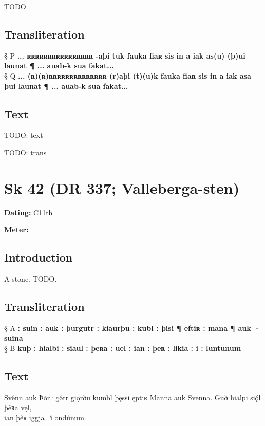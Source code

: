 TODO.

\subsection{Transliteration}

§ P \textbf{    ... ʀʀʀʀʀʀʀʀʀʀʀʀʀʀʀʀ -aþi tuk fauka fiaʀ sis in a iak as(u) (þ)ui launat ¶ ... auab-k sua fakat...} \\
§ Q \textbf{    ... (ʀ)(ʀ)ʀʀʀʀʀʀʀʀʀʀʀʀʀʀ (r)aþi (t)(u)k fauka fiaʀ sis in a iak asa þui launat ¶ ... auab-k sua fakat...}

\subsection{Text}

\bpg\bpa[0]%
TODO: text\epa

\bpb TODO: trans\epb\epg

\sectionline\newpage


\section{Sk 42 (DR 337; Valleberga-sten)}

\begin{flushright}%
\textbf{Dating:} C11th

\textbf{Meter:} \Fornyrdislag
\end{flushright}%

\subsection{Introduction}

A stone.  TODO.

\subsection{Transliteration}

§ A \textbf{: suin : auk : þurgutr : kiaurþu : kubl : þisi ¶ eftiʀ : mana ¶ auk · suina} \\
§ B \textbf{kuþ : hialbi : siaul : þeʀa : uel : ian : þeʀ : likia : i : luntunum}

\subsection{Text}

\bpg\bpa[0]%
\startsub Svênn auk Þȯr·gø̂tr giǫrðu kumbl þęssi ęptiʀ Manna auk Svenna. Guð hialpi siǫ́l þêʀa vęl,\endsub \\
ian þêʀ iggja \hld\ i̇́ ondúnum.\epa

